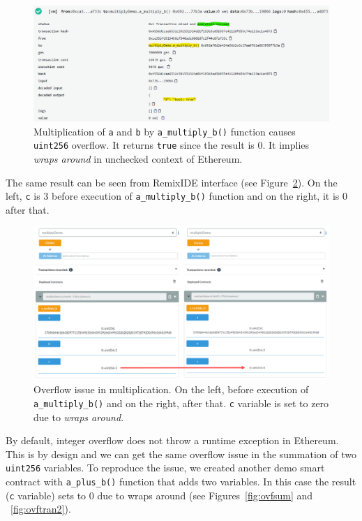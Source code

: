 \begin{figure}[t]
	\centering
	\includegraphics[width=1.0\linewidth]{figures/img06.png}
	\caption{Multiplication of \texttt{a} and \texttt{b} by \texttt{a\_multiply\_b()} function causes \texttt{uint256} overflow. It returns \texttt{true} since the result is 0. It implies \textit{wraps around} in unchecked context of Ethereum.}
	\label{fig:ovftran}
\end{figure}

The same result can be seen from RemixIDE interface (see Figure~\ref{fig:ovfmul}). On the left, \texttt{c} is 3 before execution of \texttt{a\_multiply\_b()} function and on the right, it is 0 after that.
\begin{figure}[t]
	\centering
	\includegraphics[width=1.0\linewidth]{figures/img07.png}
	\caption{Overflow issue in multiplication. On the left, before execution of \texttt{a\_multiply\_b()} and on the right, after that. \texttt{c} variable is set to zero due to \textit{wraps around}.}
	\label{fig:ovfmul}
\end{figure}

By default, integer overflow does not throw a runtime exception in Ethereum. This is by design and we can get the same overflow issue in the summation of two \texttt{uint256} variables. To reproduce the issue, we created another demo smart contract with \texttt{a\_plus\_b()} function that adds two variables. In this case the result (\texttt{c} variable) sets to 0 due to wraps around (see Figures~\ref{fig:ovfsum} and ~\ref{fig:ovftran2}).

